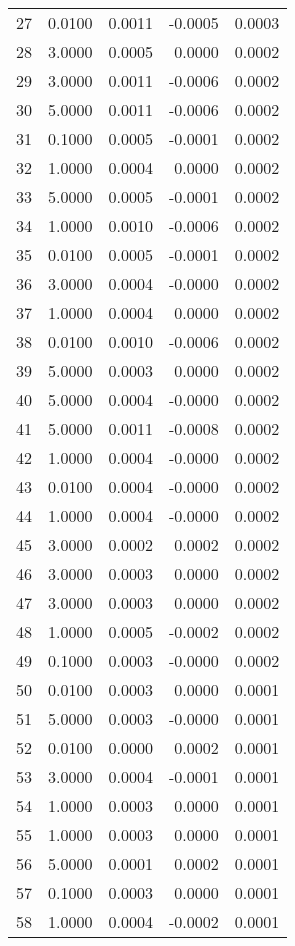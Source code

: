 \begin{longtable}{lrrrr}
27 & 0.0100 & 0.0011 & -0.0005 & 0.0003 \\
28 & 3.0000 & 0.0005 & 0.0000 & 0.0002 \\
29 & 3.0000 & 0.0011 & -0.0006 & 0.0002 \\
30 & 5.0000 & 0.0011 & -0.0006 & 0.0002 \\
31 & 0.1000 & 0.0005 & -0.0001 & 0.0002 \\
32 & 1.0000 & 0.0004 & 0.0000 & 0.0002 \\
33 & 5.0000 & 0.0005 & -0.0001 & 0.0002 \\
34 & 1.0000 & 0.0010 & -0.0006 & 0.0002 \\
35 & 0.0100 & 0.0005 & -0.0001 & 0.0002 \\
36 & 3.0000 & 0.0004 & -0.0000 & 0.0002 \\
37 & 1.0000 & 0.0004 & 0.0000 & 0.0002 \\
38 & 0.0100 & 0.0010 & -0.0006 & 0.0002 \\
39 & 5.0000 & 0.0003 & 0.0000 & 0.0002 \\
40 & 5.0000 & 0.0004 & -0.0000 & 0.0002 \\
41 & 5.0000 & 0.0011 & -0.0008 & 0.0002 \\
42 & 1.0000 & 0.0004 & -0.0000 & 0.0002 \\
43 & 0.0100 & 0.0004 & -0.0000 & 0.0002 \\
44 & 1.0000 & 0.0004 & -0.0000 & 0.0002 \\
45 & 3.0000 & 0.0002 & 0.0002 & 0.0002 \\
46 & 3.0000 & 0.0003 & 0.0000 & 0.0002 \\
47 & 3.0000 & 0.0003 & 0.0000 & 0.0002 \\
48 & 1.0000 & 0.0005 & -0.0002 & 0.0002 \\
49 & 0.1000 & 0.0003 & -0.0000 & 0.0002 \\
50 & 0.0100 & 0.0003 & 0.0000 & 0.0001 \\
51 & 5.0000 & 0.0003 & -0.0000 & 0.0001 \\
52 & 0.0100 & 0.0000 & 0.0002 & 0.0001 \\
53 & 3.0000 & 0.0004 & -0.0001 & 0.0001 \\
54 & 1.0000 & 0.0003 & 0.0000 & 0.0001 \\
55 & 1.0000 & 0.0003 & 0.0000 & 0.0001 \\
56 & 5.0000 & 0.0001 & 0.0002 & 0.0001 \\
57 & 0.1000 & 0.0003 & 0.0000 & 0.0001 \\
58 & 1.0000 & 0.0004 & -0.0002 & 0.0001 \\

\end{longtable}
